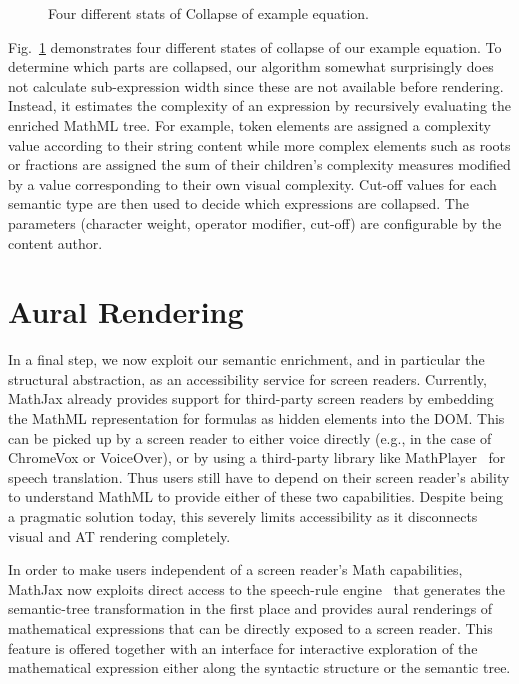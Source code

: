 \documentclass[conference]{IEEEtran}
\begin{document}
\begin{figure}[t]
\begin{minipage}{.25\textwidth}
  \end{minipage}
  \caption{Four different stats of Collapse of example equation.}
  \label{fig:collapse}
\end{figure}


Fig.~\ref{fig:collapse} demonstrates four different states of collapse of our
example equation.  To determine which parts are collapsed, our algorithm
somewhat surprisingly does not calculate sub-expression width since these are
not available before rendering. Instead, it estimates the complexity of an
expression by recursively evaluating the enriched MathML tree. For example,
token elements are assigned a complexity value according to their string content
while more complex elements such as roots or fractions are assigned the sum of
their children's complexity measures modified by a value corresponding to their
own visual complexity. Cut-off values for each semantic type are then used to
decide which expressions are collapsed. The parameters (character weight,
operator modifier, cut-off) are configurable by the content author.

\section{Aural Rendering}

In a final step, we now exploit our semantic enrichment, and in particular the
structural abstraction, as an accessibility service for screen readers.  Currently,
MathJax already provides support for third-party screen readers by embedding the
MathML representation for formulas as hidden elements into the DOM. This can be
picked up by a screen reader to either voice directly (e.g., in the case of
ChromeVox or VoiceOver), or by using a third-party library like
MathPlayer~\cite{soiffer2005mathplayer} for speech translation. Thus users still
have to depend on their screen reader's ability to understand MathML to provide either of these two
capabilities.  Despite being a pragmatic solution today, this severely
limits accessibility as it disconnects visual and AT rendering completely.

In order to make users independent of a screen reader's Math capabilities,
MathJax now exploits direct access to the speech-rule engine~\cite{Sorge14}
that generates the semantic-tree transformation in the first place and provides
aural renderings of mathematical expressions that can be directly exposed to a
screen reader.  This feature is offered together with an interface for
interactive exploration of the mathematical expression either along the
syntactic structure or the semantic tree.
\end{document}
